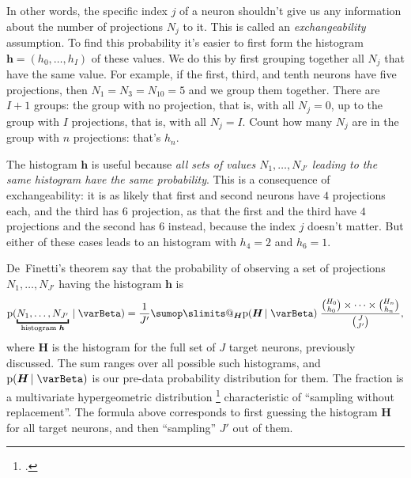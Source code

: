 \documentclass[\ifafour a4paper,12pt,\else a5paper,10pt,\fi%
onecolumn,oneside,article,%
british%
]{memoir}
\makeatletter
\theoremstyle{remark}
\theoremstyle{innote}
\def\sum{\DOTSI\sumop\slimits@}
\newcommand*{\citep}{\footcites}
\newcommand*{\pf}{\mathrm{p}}%
\renewcommand*{\|}[1][]{\nonscript\,#1\vert\nonscript\;\mathopen{}}
\newcommand*{\chap}{ch.}%
\newcommand*{\yI}{\varBeta}
\newcommand*{\yh}{\bm{h}}
\newcommand*{\yH}{\bm{H}}
\makeatother
\begin{document}
\clearpage

\bigskip


In other words, the specific index $j$
of a neuron shouldn't give us any information about the number of
projections $N_{j}$ to it. This is called an \emph{exchangeability}
assumption. To find this probability it's easier to first form the
histogram $\yh=(h_{0},\dotsc,h_{I})$ of these values. We do this by first
grouping together all $N_{j}$ that have the same value. For example, if the
first, third, and tenth neurons have five projections, then
$N_{1}=N_{3}=N_{10}=5$ and we group them together. There are $I+1$ groups:
the group with no projection, that is, with all $N_{j}=0$, up to the group
with $I$ projections, that is, with all $N_{j}=I$. Count how many $N_{j}$
are in the group with $n$ projections: that's $h_{n}$.

The histogram $\yh$ is useful because \emph{all sets of values
  $N_{1},\dotsc,N_{J'}$ leading to the same histogram have the same
  probability}. This is a consequence of exchangeability: it is as likely
that first and second neurons have $4$ projections each, and the third has
$6$ projection, as that the first and the third have $4$ projections and
the second has $6$ instead, because the index $j$ doesn't matter. But
either of these cases leads to an histogram with $h_{4}=2$ and $h_{6}=1$.

De~Finetti's theorem say that the probability of observing a set of
projections $N_{1},\dotsc,N_{J'}$ having the histogram $\yh$ is
\begin{equation}
  \label{eq:definetti_Nj_finite}
  \pf(\underbracket{N_{1},\dotsc,N_{J'}}_{\text{histogram $\yh$}} \| \yI) =
\frac{1}{J'}  \sum_{\yH} \pf(\yH \| \yI)\;
  \frac{\binom{H_{0}}{h_{0}}\times\dotsm\times\binom{H_{n}}{h_{n}}}{\binom{J}{J'}},
\end{equation}
where $\yH$ is the histogram for the full set of $J$ target neurons,
previously discussed. The sum ranges over all possible such histograms, and
$\pf(\yH \| \yI)$ is our pre-data probability distribution for them. The
fraction is a multivariate hypergeometric distribution
\citep[\chap~39]{johnsonetal1969_r1996} characteristic of \enquote{sampling
  without replacement}. The formula above corresponds to first guessing the
histogram $\yH$ for all target neurons, and then \enquote{sampling} $J'$
out of them.
\end{document}
